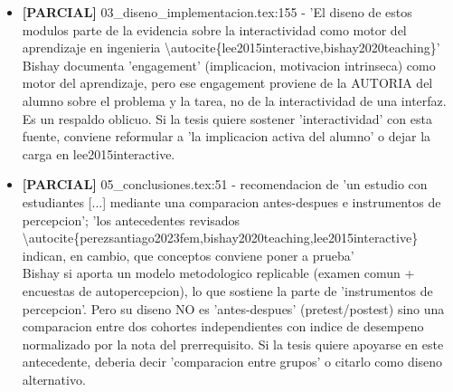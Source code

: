 \documentclass[11pt,a4paper]{article}
\newcommand{\campo}[1]{\textcolor{gris}{\footnotesize #1}}
\begin{document}
\begin{itemize}
\item \textbf{[PARCIAL]} 03\_diseno\_implementacion.tex:155 - 'El diseno de estos modulos parte de la evidencia sobre la interactividad como motor del aprendizaje en ingenieria \textbackslash{}autocite\{lee2015interactive,bishay2020teaching\}'
\\ \campo{Bishay documenta 'engagement' (implicacion, motivacion intrinseca) como motor del aprendizaje, pero ese engagement proviene de la AUTORIA del alumno sobre el problema y la tarea, no de la interactividad de una interfaz. Es un respaldo oblicuo. Si la tesis quiere sostener 'interactividad' con esta fuente, conviene reformular a 'la implicacion activa del alumno' o dejar la carga en lee2015interactive.}
\item \textbf{[PARCIAL]} 05\_conclusiones.tex:51 - recomendacion de 'un estudio con estudiantes [...] mediante una comparacion antes-despues e instrumentos de percepcion'; 'los antecedentes revisados \textbackslash{}autocite\{perezsantiago2023fem,bishay2020teaching,lee2015interactive\} indican, en cambio, que conceptos conviene poner a prueba'
\\ \campo{Bishay si aporta un modelo metodologico replicable (examen comun + encuestas de autopercepcion), lo que sostiene la parte de 'instrumentos de percepcion'. Pero su diseno NO es 'antes-despues' (pretest/postest) sino una comparacion entre dos cohortes independientes con indice de desempeno normalizado por la nota del prerrequisito. Si la tesis quiere apoyarse en este antecedente, deberia decir 'comparacion entre grupos' o citarlo como diseno alternativo.}
\end{itemize}
\end{document}
